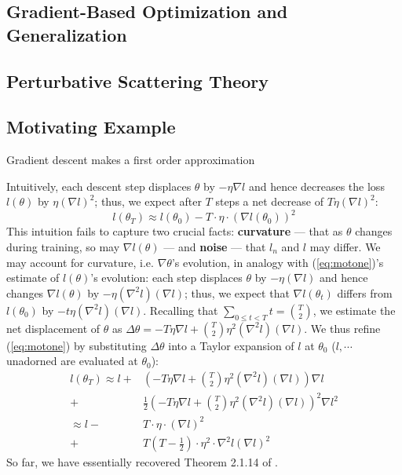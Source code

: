 \documentclass{article}
\newcommand{\wrap}[1]{\left( #1 \right)}
\begin{document}
\subsection*{Gradient-Based Optimization and Generalization}

\subsection*{Perturbative Scattering Theory}

\subsection*{Motivating Example}
    Gradient descent makes a first order approximation  

    Intuitively, each descent step displaces $\theta$ by $-\eta \nabla l$ and
    hence decreases the loss $l(\theta)$ by $\eta (\nabla l)^2$; thus, we
    expect after $T$ steps a net decrease of $T \eta (\nabla l)^2$:
    \begin{equation} \label{eq:motone}
        l(\theta_T) \approx l(\theta_0) - T \cdot \eta \cdot (\nabla l(\theta_0))^2
    \end{equation}
    This intuition fails to capture two crucial facts: {\bf curvature} --- that
    as $\theta$ changes during training, so may $\nabla l(\theta)$ --- and {\bf
    noise} --- that $l_n$ and $l$ may differ.
    We may account for curvature, i.e. $\nabla \theta$'s evolution, in analogy
    with (\ref{eq:motone})'s estimate of $l(\theta)$'s evolution: each step
    displaces $\theta$ by $-\eta(\nabla l)$ and hence changes $\nabla
    l(\theta)$ by $-\eta (\nabla^2 l) (\nabla l)$; thus, we expect that $\nabla
    l(\theta_t)$ differs from $l(\theta_0)$ by $-t \eta (\nabla^2 l) (\nabla
    l)$.  Recalling that $\sum_{0\leq t<T} t = {T \choose 2}$, we estimate the
    net displacement of $\theta$ as $\Delta \theta = -T \eta \nabla l + {T
    \choose 2} \eta^2 (\nabla^2 l) (\nabla l)$.  We thus refine
    (\ref{eq:motone}) by substituting $\Delta \theta$ into a Taylor expansion
    of $l$ at $\theta_0$ ($l, \cdots$ unadorned are evaluated at $\theta_0$):
    \begin{align} \label{eq:mottwo}
        l(\theta_T)
        \approx l +& \wrap{-T \eta \nabla l + {T \choose 2} \eta^2 (\nabla^2 l) (\nabla l)} \nabla l \\
                  +& \frac{1}{2} \wrap{-T \eta \nabla l + {T \choose 2} \eta^2 (\nabla^2 l) (\nabla l)}^2 \nabla l^2 \\
        \approx l -& T \cdot \eta \cdot \wrap{\nabla l}^2 \\
                  +& T \wrap{T-\frac{1}{2}} \cdot \eta^2 \cdot \nabla^2 l (\nabla l)^2
    \end{align}
    So far, we have essentially recovered Theorem 2.1.14 of \citet{ne04}.
    
\end{document}
